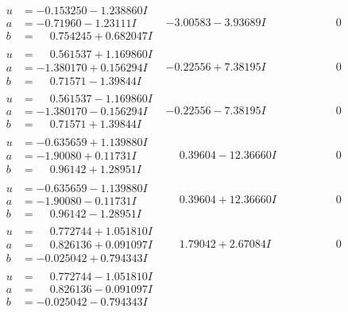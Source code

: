 \documentclass[1p]{elsarticle_modified}
\theoremstyle{definition}
\begin{document}
$$\begin{array}{c|c|c}
\begin{aligned}
u &= -0.153250 - 1.238860 I \\
a &= -0.71960 - 1.23111 I \\
b &= \phantom{-}0.754245 + 0.682047 I\end{aligned}
 & -3.00583 - 3.93689 I & \phantom{-0.000000 } 0 \\ \hline\begin{aligned}
u &= \phantom{-}0.561537 + 1.169860 I \\
a &= -1.380170 + 0.156294 I \\
b &= \phantom{-}0.71571 - 1.39844 I\end{aligned}
 & -0.22556 + 7.38195 I & \phantom{-0.000000 } 0 \\ \hline\begin{aligned}
u &= \phantom{-}0.561537 - 1.169860 I \\
a &= -1.380170 - 0.156294 I \\
b &= \phantom{-}0.71571 + 1.39844 I\end{aligned}
 & -0.22556 - 7.38195 I & \phantom{-0.000000 } 0 \\ \hline\begin{aligned}
u &= -0.635659 + 1.139880 I \\
a &= -1.90080 + 0.11731 I \\
b &= \phantom{-}0.96142 + 1.28951 I\end{aligned}
 & \phantom{-}0.39604 - 12.36660 I & \phantom{-0.000000 } 0 \\ \hline\begin{aligned}
u &= -0.635659 - 1.139880 I \\
a &= -1.90080 - 0.11731 I \\
b &= \phantom{-}0.96142 - 1.28951 I\end{aligned}
 & \phantom{-}0.39604 + 12.36660 I & \phantom{-0.000000 } 0 \\ \hline\begin{aligned}
u &= \phantom{-}0.772744 + 1.051810 I \\
a &= \phantom{-}0.826136 + 0.091097 I \\
b &= -0.025042 + 0.794343 I\end{aligned}
 & \phantom{-}1.79042 + 2.67084 I & \phantom{-0.000000 } 0 \\ \hline\begin{aligned}
u &= \phantom{-}0.772744 - 1.051810 I \\
a &= \phantom{-}0.826136 - 0.091097 I \\
b &= -0.025042 - 0.794343 I\end{aligned}

\end{array}$$
\end{document}
